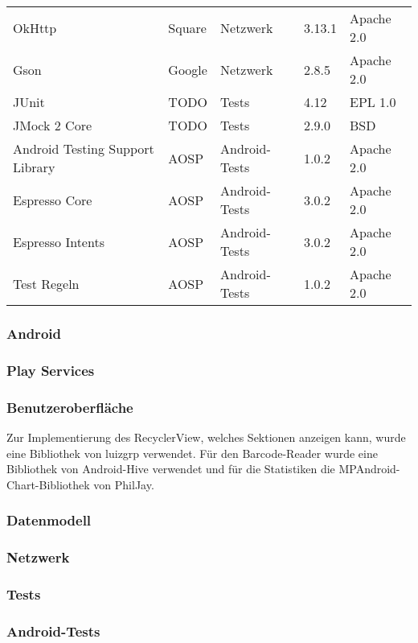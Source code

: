 \begin{tabularx}{\textwidth}{|X|l|l|l|l|}
    OkHttp & Square & Netzwerk & 3.13.1 & Apache 2.0\\   %
    Gson & Google & Netzwerk & 2.8.5 & Apache 2.0\\   %
    \hline

    JUnit & TODO & Tests & 4.12 & EPL 1.0\\   %
    JMock 2 Core & TODO & Tests & 2.9.0 & BSD\\    %
    \hline

    Android Testing Support Library & AOSP & Android-Tests & 1.0.2 & Apache 2.0\\   %
    Espresso Core & AOSP & Android-Tests & 3.0.2 & Apache 2.0\\    %
    Espresso Intents & AOSP & Android-Tests & 3.0.2 & Apache 2.0\\ %
    Test Regeln & AOSP & Android-Tests & 1.0.2 & Apache 2.0\\  %
    \hline
\end{tabularx}

\subsubsection{Android} \label{subsubsec:android-libraries}

\subsubsection{Play Services} \label{subsubsec:play-service-libraries}

\subsubsection{Benutzeroberfläche} \label{subsubsec:ui-libraries}
Zur Implementierung des RecyclerView, welches Sektionen anzeigen kann, wurde eine Bibliothek von luizgrp verwendet.
Für den Barcode-Reader wurde eine Bibliothek von Android-Hive verwendet und für die Statistiken die MPAndroid-Chart-Bibliothek von PhilJay.

\subsubsection{Datenmodell} \label{subsubsec:model-libraries}

\subsubsection{Netzwerk} \label{subsubsec:network-libraries}

\subsubsection{Tests} \label{subsubsec:tests-libraries}

\subsubsection{Android-Tests} \label{subsubsec:android-tests-libraries}
